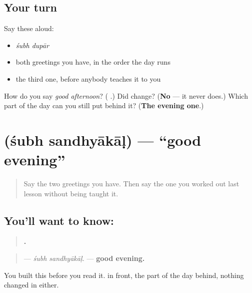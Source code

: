\subsection*{Your turn}
Say these aloud:

\begin{itemize}
\raggedright
  \item \emph{śubh dupār}
  \item both greetings you have, in the order the day runs
  \item the third one, before anybody teaches it to you
\end{itemize}

\begin{tcolorbox}[breakable,colback=teal!4,colframe=teal!35!black,title={Before you move on}]
How do you say \emph{good afternoon}? (\emph{\textbf{ }}.) Did \textbf{} change? (\textbf{No} — it never does.) Which part of the day can you still put behind it? (\textbf{The evening one}.)
\end{tcolorbox}
\section[\texorpdfstring{\mr{शुभ} \mr{संध्याकाळ} (śubh sandhyākāḷ)}{शुभ संध्याकाळ (śubh sandhyākāḷ)}]{  (śubh sandhyākāḷ) — \textquotedblleft{}good evening\textquotedblright{}}

\label{lesson:MR-C68-shubh-sandhyakal}



\begin{quote}
Say the two greetings you have. Then say the one you worked out last lesson without being taught it.
\end{quote}

\subsection*{You'll want to know:  }
\begin{quote}
\textbf{ .}
\end{quote}

\begin{quote}
— \emph{śubh sandhyākāḷ.} — \textbf{good evening.}
\end{quote}

You built this before you read it. \textbf{} in front, the part of the day behind, nothing changed in either.

